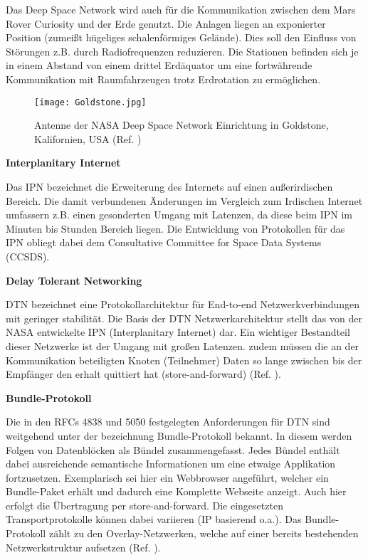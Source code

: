 Das Deep Space Network wird auch f{\"u}r die Kommunikation zwischen dem Mars
Rover Curiosity und der Erde genutzt. Die Anlagen liegen an exponierter Position
(zumei{\ss}t h{\"u}geliges schalenf{\"o}rmiges Gel{\"a}nde). Dies soll den
Einfluss von St{\"o}rungen z.B. durch Radiofrequenzen reduzieren. Die Stationen
befinden sich je in einem Abstand von einem drittel Erd{\"a}quator um eine
fortw{\"a}hrende Kommunikation mit Raumfahrzeugen trotz Erdrotation zu
erm{\"o}glichen.

\begin{figure}[H]
\centering
\texttt{[image: Goldstone.jpg]}
\caption{Antenne der NASA Deep Space Network Einrichtung in Goldstone,
Kalifornien, USA (Ref. \cite{imgGoldstone})}
\label{fig:Goldstone}
\end{figure}

\textbf{Interplanitary Internet}

Das IPN bezeichnet die Erweiterung des Internets auf einen au{\ss}erirdischen
Bereich. Die damit verbundenen {\"A}nderungen im Vergleich zum Irdischen
Internet umfassern z.B. einen gesonderten Umgang mit Latenzen, da diese beim IPN
im Minuten bis Stunden Bereich liegen. Die Entwicklung von Protokollen
f{\"u}r das IPN obliegt dabei dem Consultative Committee for Space Data Systems
(CCSDS).

\textbf{Delay Tolerant Networking}

DTN bezeichnet eine Protokollarchitektur f{\"u}r End-to-end Netzwerkverbindungen
mit geringer stabilit{\"a}t. Die Basis der DTN Netzwerkarchitektur stellt das
von der NASA entwickelte IPN (Interplanitary Internet) dar. Ein wichtiger
Bestandteil dieser Netzwerke ist der Umgang mit gro{\ss}en Latenzen. zudem
m{\"u}ssen die an der Kommunikation beteiligten Knoten (Teilnehmer) Daten so
lange zwischen bis der Empf{\"a}nger den erhalt quittiert hat
(store-and-forward) (Ref. \cite{web3}).

\textbf{Bundle-Protokoll}

Die in den RFCs 4838 und 5050 festgelegten Anforderungen f{\"u}r DTN sind
weitgehend unter der bezeichnung Bundle-Protokoll bekannt. In diesem werden Folgen von
Datenbl{\"o}cken als B{\"u}ndel zusammengefasst. Jedes B{\"u}ndel enth{\"a}lt
dabei ausreichende semantische Informationen um eine etwaige Applikation
fortzusetzen. Exemplarisch sei hier ein Webbrowser angef{\"u}hrt, welcher ein
Bundle-Paket erh{\"a}lt und dadurch eine Komplette Webseite anzeigt. Auch hier
erfolgt die {\"U}bertragung per store-and-forward. Die eingesetzten
Transportprotokolle k{\"o}nnen dabei variieren (IP basierend o.a.). Das
Bundle-Protokoll z{\"a}hlt zu den Overlay-Netzwerken, welche auf einer bereits
bestehenden Netzwerkstruktur aufsetzen (Ref. \cite{web1}).

